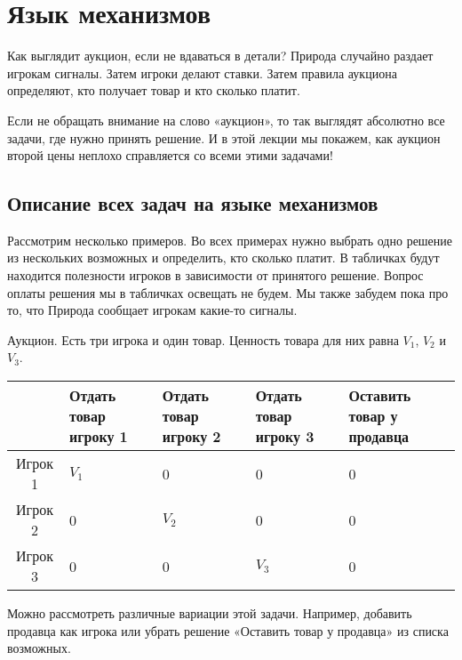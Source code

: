 \chapter{Язык механизмов}
Как выглядит аукцион, если не вдаваться в детали? Природа случайно раздает игрокам сигналы. Затем игроки делают ставки. Затем правила аукциона определяют, кто получает товар и кто сколько платит.

Если не обращать внимание на слово «аукцион», то так выглядят абсолютно все задачи, где нужно принять решение. И в этой лекции мы покажем, как аукцион второй цены неплохо справляется со всеми этими задачами!





\section{Описание всех задач на языке механизмов}

Рассмотрим несколько примеров. Во всех примерах нужно выбрать одно решение из нескольких возможных и определить, кто сколько платит. В табличках будут находится полезности игроков в зависимости от принятого решение. Вопрос оплаты решения мы в табличках освещать не будем. Мы также забудем пока про то, что Природа сообщает игрокам какие-то сигналы.


\begin{myex} Аукцион. Есть три игрока и один товар. Ценность товара для них равна $ V_{1} $, $ V_{2} $ и $ V_{3} $.

\begin{tabular}{c|p{3 cm}p{3 cm}p{3 cm}p{3 cm}}
& Отдать товар игроку 1 & Отдать товар игроку 2 & Отдать товар игроку 3 & Оставить товар у продавца \\
\hline
Игрок 1 & $ V_{1} $ & 0 & 0 & 0\\
Игрок 2 & 0 & $ V_{2} $ & 0 & 0\\
Игрок 3 & 0 & 0 & $ V_{3} $ & 0\\
\end{tabular}

Можно рассмотреть различные вариации этой задачи. Например, добавить продавца как игрока или убрать решение «Оставить товар у продавца» из списка возможных.

\end{myex}


